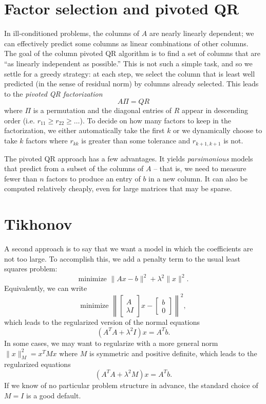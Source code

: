 \documentclass[12pt, leqno]{article} %
\begin{document}
\section{Factor selection and pivoted QR}

In ill-conditioned problems, the columns of $A$ are nearly linearly
dependent; we can effectively predict some columns as linear
combinations of other columns.  The goal of the column pivoted QR
algorithm is to find a set of columns that are ``as linearly
independent as possible.''  This is not such a simple task,
and so we settle for a greedy strategy: at each step, we select the
column that is least well predicted (in the sense of residual norm)
by columns already selected.  This leads to the {\em pivoted QR
  factorization}
\[
  A \Pi = Q R
\]
where $\Pi$ is a permutation and the diagonal entries of $R$ appear
in descending order (i.e. $r_{11} \geq r_{22} \geq \ldots$).  To
decide on how many factors to keep in the factorization, we either
automatically take the first $k$ or we dynamically choose to take $k$
factors where $r_{kk}$ is greater than some tolerance and
$r_{k+1,k+1}$ is not.

The pivoted QR approach has a few advantages.  It yields {\em
  parsimonious} models that predict from a subset of the columns of
$A$ -- that is, we need to measure fewer than $n$ factors to produce
an entry of $b$ in a new column.  It can also be computed relatively
cheaply, even for large matrices that may be sparse.

\section{Tikhonov}

A second approach is to say that we want a model in which the
coefficients are not too large.  To accomplish this, we add
a penalty term to the usual least squares problem:
\[
  \mbox{minimize } \|Ax-b\|^2 + \lambda^2 \|x\|^2.
\]
Equivalently, we can write
\[
\mbox{minimize } \left\|
\begin{bmatrix} A \\ \lambda I \end{bmatrix} x -
\begin{bmatrix} b \\ 0 \end{bmatrix}
\right\|^2,
\]
which leads to the regularized version of the normal equations
\[
  (A^T A + \lambda^2 I) x = A^T b.
\]
In some cases, we may want to regularize with a more general
norm $\|x\|_M^2 = x^T M x$ where $M$ is symmetric and positive
definite, which leads to the regularized equations
\[
  (A^T A + \lambda^2 M) x = A^T b.
\]
If we know of no particular problem structure in advance, the
standard choice of $M = I$ is a good default.
\end{document}
